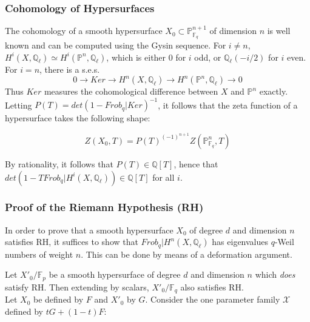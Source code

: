 \documentclass{beamer}
\begin{document}
\begin{frame}
\frametitle{Cohomology of Hypersurfaces}
\pause
The cohomology of a smooth hypersurface $X_0 \subset \mathbb{P}_{\mathbb{F}_{q}}^{n+1}$ of dimension $n$ is well known and can be computed using the Gysin sequence. 
\pause
For $i\neq n$, $H^{i}(X,\mathbb{Q}_{\ell}) \simeq H^{i}(\mathbb{P}^{n},\mathbb{Q}_{\ell})$, which is either $0$ for $i$ odd, or $ \mathbb{Q}_{\ell}(-i/2)$ for $i$ even. For $i=n$, there is a s.e.s. 
$$0 \rightarrow Ker \rightarrow H^{n}(X,\mathbb{Q}_{\ell}) \rightarrow H^{n}(\mathbb{P}^{n},\mathbb{Q}_{\ell}) \rightarrow 0$$
\pause
Thus $Ker$ measures the cohomological difference between $X$ and $\mathbb{P}^{n}$ exactly.\\ \pause Letting $P(T) = det(1-Frob_{q}|Ker)^{-1}$, it follows that the zeta function of a hypersurface takes the following shape:

$$Z(X_0,T)  = P(T)^{(-1)^{n+1}}Z(\mathbb{P}^{n}_{\mathbb{F}_{q}},T)$$

\pause By rationality, it follows that $P(T)\in \mathbb{Q}[T]$, hence that $det(1-TFrob_{q}|H^{i}(X,\mathbb{Q}_{\ell})) \in \mathbb{Q}[T]$ for all $i$.
 
\end{frame}

\begin{frame}[fragile]
\frametitle{Proof of the Riemann Hypothesis (RH)}
\pause
In order to prove that a smooth hypersurface $X_{0}$ of degree $d$ and dimension $n$ satisfies RH, it suffices to show that $Frob_{q}|H^{n}(X,\mathbb{Q}_{\ell})$ has eigenvalues $q$-Weil numbers of weight $n$. This can be done by means of a deformation argument.\vspace{2mm}
\pause

Let $X'_{0}/\mathbb{F}_{p}$ be a smooth hypersurface of degree $d$ and dimension $n$ which \emph{does} satisfy RH. Then extending by scalars, $X'_{0}/\mathbb{F}_{q}$ also satisfies RH. \\

\pause 
Let $X_{0}$ be defined by $F$ and $X'_{0}$ by $G$. Consider the one parameter family $\mathcal{X}$ defined by $tG + (1-t)F$:

\begin{center}
\end{center}
\end{frame}
\end{document}
